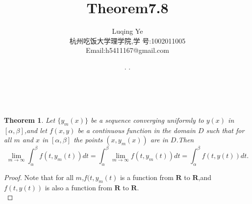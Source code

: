 \documentclass[a4paper, 12pt]{article} %
\makeatletter
\newtheorem*{adtheorem}{Theorem}
\newenvironment{theorem}
{\bigskip\begin{mdframed}[backgroundcolor=gray!40,rightline=false,leftline=false,topline=false,bottomline=false]\begin{adtheorem}}
    {\end{adtheorem}\end{mdframed}\bigskip}
\renewcommand{\maketitle}{ %
  \renewcommand\refname{参考文献}
  \newcommand{\D}{\displaystyle}\newcommand{\ri}{\Rightarrow}
  \newcommand{\ds}{\displaystyle} \renewcommand{\ni}{\noindent}
  \newcommand{\pa}{\partial} \newcommand{\Om}{\Omega}
  \newcommand{\om}{\omega} \newcommand{\sik}{\sum_{i=1}^k}
  \newcommand{\vov}{\Vert\omega\Vert} \newcommand{\Umy}{U_{\mu_i,y^i}}
  \newcommand{\lamns}{\lambda_n^{^{\scriptstyle\sigma}}}
  \newcommand{\chiomn}{\chi_{_{\Omega_n}}}
  \newcommand{\ullim}{\underline{\lim}} \newcommand{\bsy}{\boldsymbol}
  \newcommand{\mvb}{\mathversion{bold}} \newcommand{\la}{\lambda}
  \newcommand{\La}{\Lambda} \newcommand{\va}{\varepsilon}
  \newcommand{\be}{\beta} \newcommand{\al}{\alpha}
  \newcommand{\dis}{\displaystyle} \newcommand{\R}{{\mathbb R}}
  \newcommand{\N}{{\mathbb N}} \newcommand{\cF}{{\mathcal F}}
  \newcommand{\gB}{{\mathfrak B}} \newcommand{\eps}{\epsilon}
  \begin{flushright} %
    {\LARGE\@title} %
    
    \vspace{50pt} %
    
    {\large\@author} %
    \\\@date %
    
    \vspace{40pt} %
  \end{flushright}
}
\makeatother
\begin{document}
\begin{CJK}{UTF8}{gkai}
  \title{\textbf{Theorem7.8}}
  \author{\small{Luqing Ye}\\{\small{杭州吃饭大学理学院,学
        号:1002011005}}\\{\small{Email:h5411167@gmail.com}}} %
  \renewcommand{\today}{\number\year. \number\month. \number\day}
  \date{\today} %
  
  
  
  \maketitle %
  
  
  
  
  
  
  
  \begin{theorem}
    Let $\{y_m(x)\}$ be a sequence converging uniformly to $y(x)$ in
    $[\alpha,\beta]$,and let $f(x,y)$ be a continuous function in the
    domain $D$ such that for all $m$ and $x$ in $[\alpha,\beta]$ the
    points $(x,y_m(x))$ are in $D$.Then
    \begin{equation}
      \label{eq:1}
      \lim_{m\to\infty}\int_{\alpha}^{\beta}f(t,y_m(t))dt=\int_{\alpha}^{\beta}\lim_{m\to\infty}f(t,y_m(t))dt=\int_{\alpha}^{\beta}f(t,y(t))dt.
    \end{equation}
\end{theorem}
\begin{proof}
  Note that for all $m$,$f(t,y_m(t)$ is a function from $\mathbf{R}$
  to $\mathbf{R}$,and $f(t,y(t))$ is also a function from $\mathbf{R}$
  to $\mathbf{R}$.\\


\end{proof}
\end{CJK}
\end{document}
